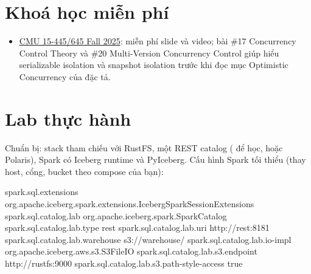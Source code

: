 \section{Khoá học miễn phí}
\begin{itemize}
  \item \href{https://15445.courses.cs.cmu.edu/fall2025/schedule.html}{CMU 15-445/645 Fall 2025}: miễn phí slide và video; bài \#17 Concurrency Control Theory và \#20 Multi-Version Concurrency Control giúp hiểu serializable isolation và snapshot isolation trước khi đọc mục Optimistic Concurrency của đặc tả.
\end{itemize}

\section{Lab thực hành}
Chuẩn bị: stack tham chiếu với RustFS, một REST catalog ( để học, hoặc Polaris), Spark có Iceberg runtime và PyIceberg. Cấu hình Spark tối thiểu (thay host, cổng, bucket theo compose của bạn):
\begin{codeblock}
spark.sql.extensions            org.apache.iceberg.spark.extensions.IcebergSparkSessionExtensions
spark.sql.catalog.lab           org.apache.iceberg.spark.SparkCatalog
spark.sql.catalog.lab.type      rest
spark.sql.catalog.lab.uri       http://rest:8181
spark.sql.catalog.lab.warehouse s3://warehouse/
spark.sql.catalog.lab.io-impl   org.apache.iceberg.aws.s3.S3FileIO
spark.sql.catalog.lab.s3.endpoint          http://rustfs:9000
spark.sql.catalog.lab.s3.path-style-access true
\end{codeblock}


